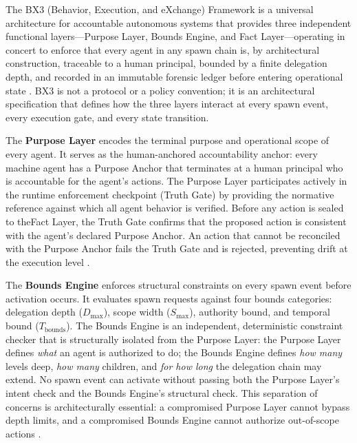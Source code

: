 The BX3 (Behavior, Execution, and eXchange) Framework is a universal architecture for accountable autonomous systems that provides three independent functional layers---Purpose Layer, Bounds Engine, and Fact Layer---operating in concert to enforce that every agent in any spawn chain is, by architectural construction, traceable to a human principal, bounded by a finite delegation depth, and recorded in an immutable forensic ledger before entering operational state \cite{bx3framework,bx3framework2026}. BX3 is not a protocol or a policy convention; it is an architectural specification that defines how the three layers interact at every spawn event, every execution gate, and every state transition.

The \textbf{Purpose Layer} encodes the terminal purpose and operational scope of every agent. It serves as the human-anchored accountability anchor: every machine agent has a Purpose Anchor that terminates at a human principal who is accountable for the agent's actions. The Purpose Layer participates actively in the runtime enforcement checkpoint (Truth Gate) by providing the normative reference against which all agent behavior is verified. Before any action is sealed to theFact Layer, the Truth Gate confirms that the proposed action is consistent with the agent's declared Purpose Anchor. An action that cannot be reconciled with the Purpose Anchor fails the Truth Gate and is rejected, preventing drift at the execution level \cite{bx3framework}.

The \textbf{Bounds Engine} enforces structural constraints on every spawn event before activation occurs. It evaluates spawn requests against four bounds categories: delegation depth ($D_{\max}$), scope width ($S_{\max}$), authority bound, and temporal bound ($T_{\text{bounds}}$). The Bounds Engine is an independent, deterministic constraint checker that is structurally isolated from the Purpose Layer: the Purpose Layer defines \emph{what} an agent is authorized to do; the Bounds Engine defines \emph{how many} levels deep, \emph{how many} children, and \emph{for how long} the delegation chain may extend. No spawn event can activate without passing both the Purpose Layer's intent check and the Bounds Engine's structural check. This separation of concerns is architecturally essential: a compromised Purpose Layer cannot bypass depth limits, and a compromised Bounds Engine cannot authorize out-of-scope actions \cite{bx3framework2026}.

